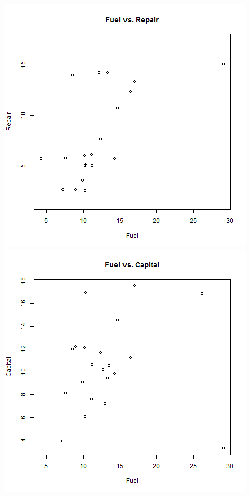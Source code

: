 \documentclass[letterpaper,10pt]{article}
\begin{document}
\begin{description}
\begin{enumerate}
\begin{center}
\includegraphics[scale=.33]{FuelvRepair.png}
\includegraphics[scale=.33]{FuelvCapital.png}

\end{center}
\end{enumerate}
\end{description}
\end{document}

